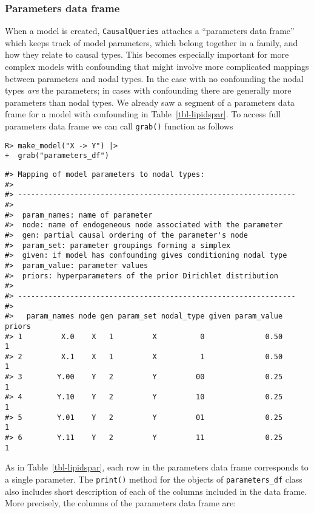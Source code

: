 \documentclass[
  11pt,
  article]{jss}
\begin{document}
\hypertarget{sec-param-df}{%
\subsubsection{Parameters data frame}\label{sec-param-df}}

When a model is created, \texttt{CausalQueries} attaches a ``parameters
data frame'' which keeps track of model parameters, which belong
together in a family, and how they relate to causal types. This becomes
especially important for more complex models with confounding that might
involve more complicated mappings between parameters and nodal types. In
the case with no confounding the nodal types \emph{are} the parameters;
in cases with confounding there are generally more parameters than nodal
types. We already saw a segment of a parameters data frame for a model
with confounding in Table~\ref{tbl-lipidspar}. To access full parameters
data frame we can call \texttt{grab()} function as follows

\begin{verbatim}
R> make_model("X -> Y") |> 
+  grab("parameters_df") 
\end{verbatim}

\begin{verbatim}
#> Mapping of model parameters to nodal types: 
#> 
#> ----------------------------------------------------------------
#> 
#>  param_names: name of parameter
#>  node: name of endogeneous node associated with the parameter
#>  gen: partial causal ordering of the parameter's node
#>  param_set: parameter groupings forming a simplex
#>  given: if model has confounding gives conditioning nodal type
#>  param_value: parameter values
#>  priors: hyperparameters of the prior Dirichlet distribution 
#> 
#> ----------------------------------------------------------------
#> 
#>   param_names node gen param_set nodal_type given param_value priors
#> 1         X.0    X   1         X          0              0.50      1
#> 2         X.1    X   1         X          1              0.50      1
#> 3        Y.00    Y   2         Y         00              0.25      1
#> 4        Y.10    Y   2         Y         10              0.25      1
#> 5        Y.01    Y   2         Y         01              0.25      1
#> 6        Y.11    Y   2         Y         11              0.25      1
\end{verbatim}

As in Table~\ref{tbl-lipidspar}, each row in the parameters data frame
corresponds to a single parameter. The \texttt{print()} method for the
objects of \texttt{parameters\_df} class also includes short description
of each of the columns included in the data frame. More precisely, the
columns of the parameters data frame are:
\end{document}
